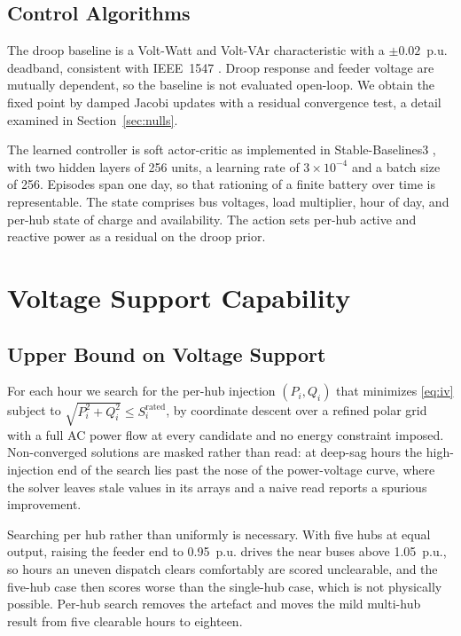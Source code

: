 \documentclass[conference,a4paper]{IEEEtran}
\begin{document}
\subsection{Control Algorithms}

The droop baseline is a Volt-Watt and Volt-VAr characteristic with a $\pm 0.02$~p.u.
deadband, consistent with IEEE~1547 \cite{ieee1547}. Droop response and feeder voltage are
mutually dependent, so the baseline is not evaluated open-loop. We obtain the fixed point by
damped Jacobi updates with a residual convergence test, a detail examined in
Section~\ref{sec:nulls}.

The learned controller is soft actor-critic \cite{haarnoja2018sac} as implemented in
Stable-Baselines3 \cite{raffin2021sb3}, with two hidden layers of 256 units, a learning rate
of $3\times10^{-4}$ and a batch size of 256. Episodes span one day, so that rationing of a
finite battery over time is representable. The state comprises bus voltages, load multiplier,
hour of day, and per-hub state of charge and availability. The action sets per-hub active and
reactive power as a residual on the droop prior.


\section{Voltage Support Capability}
\label{sec:ceiling}

\subsection{Upper Bound on Voltage Support}

For each hour we search for the per-hub injection $(P_i, Q_i)$ that minimizes \eqref{eq:iv}
subject to $\sqrt{P_i^2+Q_i^2} \le S_i^{\mathrm{rated}}$, by coordinate descent over a refined
polar grid with a full AC power flow at every candidate and no energy constraint imposed.
Non-converged solutions are masked rather than read: at deep-sag hours the high-injection end
of the search lies past the nose of the power-voltage curve, where the solver leaves stale
values in its arrays and a naive read reports a spurious improvement.

Searching per hub rather than uniformly is necessary. With five hubs at equal output, raising
the feeder end to 0.95~p.u. drives the near buses above 1.05~p.u., so hours an uneven dispatch
clears comfortably are scored unclearable, and the five-hub case then scores worse than the
single-hub case, which is not physically possible. Per-hub search removes the artefact and
moves the mild multi-hub result from five clearable hours to eighteen.
\end{document}
